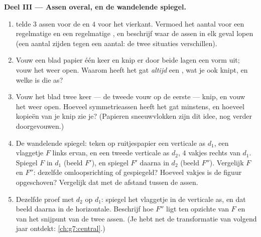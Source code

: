 \begin{problem}
\medskip
\noindent\textbf{Deel III --- Assen overal, en de wandelende spiegel.}
\begin{enumerate}[resume]
  \item {} telde $3$ assen voor de  en $4$ voor het vierkant. Vermoed het aantal voor een
        regelmatige  en een regelmatige , en beschrijf waar de
        assen in elk geval lopen (een  aantal zijden tegen een 
        aantal: de twee situaties verschillen).
  \item Vouw een blad papier één keer en knip er door beide lagen een vorm uit;
        vouw het weer open. Waarom heeft het gat \emph{altijd} een ,
        wat je ook knipt, en welke  is die as?
  \item Vouw het blad twee keer --- de tweede vouw  op de eerste ---
        knip, en vouw het weer open. Hoeveel symmetrieassen heeft het gat
        minstens, en hoeveel kopieën van je knip zie je? (Papieren sneeuwvlokken
        zijn dit idee, nog verder doorgevouwen.)
  \item De wandelende spiegel: teken op ruitjespapier een verticale as $d_1$,
        een vlaggetje $F$ links ervan, en een tweede verticale as $d_2$, $4$
        vakjes rechts van $d_1$. Spiegel $F$ in $d_1$ (beeld $F'$), en spiegel
        $F'$ daarna in $d_2$ (beeld $F''$). Vergelijk $F$ en $F''$: dezelfde
        omloopsrichting of gespiegeld? Hoeveel vakjes is de figuur opgeschoven?
        Vergelijk dat met de afstand tussen de assen.
  \item Dezelfde proef met $d_2$ \emph{} op $d_1$: spiegel het
        vlaggetje in de verticale as, en dat beeld daarna in de horizontale.
        Beschrijf hoe $F''$ ligt ten opzichte van $F$ en van het snijpunt van de
        twee assen. (Je hebt net de transformatie van volgend jaar ontdekt:
        \cref{ch:g7:central}.)
\end{enumerate}
\end{problem}
